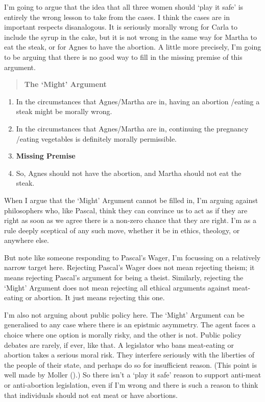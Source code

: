 \documentclass[
  11pt,
  letterpaper,
  DIV=11,
  numbers=noendperiod,
  twoside]{scrartcl}
\providecommand{\tightlist}{%
  \setlength{\itemsep}{0pt}\setlength{\parskip}{0pt}}
\begin{document}
I'm going to argue that the idea that all three women should `play it
safe' is entirely the wrong lesson to take from the cases. I think the
cases are in important respects disanalogous. It is seriously morally
wrong for Carla to include the syrup in the cake, but it is not wrong in
the same way for Martha to eat the steak, or for Agnes to have the
abortion. A little more precisely, I'm going to be arguing that there is
no good way to fill in the missing premise of this argument.

\begin{quote}
\textbf{The `Might' Argument}
\end{quote}

\begin{enumerate}
\def\labelenumi{\arabic{enumi}.}
\tightlist
\item
  In the circumstances that Agnes/Martha are in, having an abortion
  /eating a steak might be morally wrong.
\item
  In the circumstances that Agnes/Martha are in, continuing the
  pregnancy /eating vegetables is definitely morally permissible.
\item
  \textbf{Missing Premise}
\item
  So, Agnes should not have the abortion, and Martha should not eat the
  steak.
\end{enumerate}

When I argue that the `Might' Argument cannot be filled in, I'm arguing
against philosophers who, like Pascal, think they can convince us to act
as if they are right as soon as we agree there is a non-zero chance that
they are right. I'm as a rule deeply sceptical of any such move, whether
it be in ethics, theology, or anywhere else.

But note like someone responding to Pascal's Wager, I'm focussing on a
relatively narrow target here. Rejecting Pascal's Wager does not mean
rejecting theism; it means rejecting Pascal's argument for being a
theist. Similarly, rejecting the `Might' Argument does not mean
rejecting all ethical arguments against meat-eating or abortion. It just
means rejecting this one.

I'm also not arguing about public policy here. The `Might' Argument can
be generalised to any case where there is an epistmic asymmetry. The
agent faces a choice where one option is morally risky, and the other is
not. Public policy debates are rarely, if ever, like that. A legislator
who bans meat-eating or abortion takes a serious moral risk. They
interfere seriously with the liberties of the people of their state, and
perhaps do so for insufficient reason. (This point is well made by
Moller ().) So there isn't a `play
it safe' reason to support anti-meat or anti-abortion legislation, even
if I'm wrong and there is such a reason to think that individuals should
not eat meat or have abortions.
\end{document}
